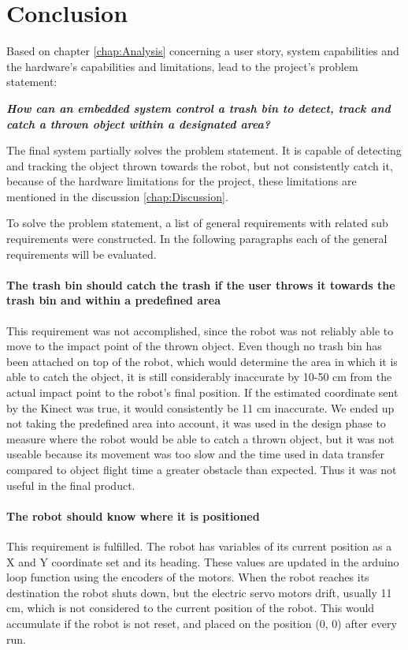 \chapter{Conclusion}
\label{chap:Conclusion}
Based on chapter \ref{chap:Analysis} concerning a user story, system capabilities and the hardware's capabilities and limitations, lead to the project’s problem statement: 

\textbf{\textit{How can an embedded system control a trash bin to detect, track and catch a thrown object within a designated area?}}

The final system partially solves the problem statement. It is capable of detecting and tracking the object thrown towards the robot, but not consistently catch it, because of the hardware limitations for the project, these limitations are mentioned in the discussion \ref{chap:Discussion}. 

To solve the problem statement, a list of general requirements with related sub requirements were constructed. In the following paragraphs each of the general requirements will be evaluated. 

\subsubsection{The trash bin should catch the trash if the user throws it towards the trash bin and within a predefined area}
\label{sub:1}
This requirement was not accomplished, since the robot was not reliably able to move to the impact point of the thrown object. Even though no trash bin has been attached on top of the robot, which would determine the area in which it is able to catch the object, it is still considerably inaccurate by 10-50 cm from the actual impact point to the robot’s final position. If the estimated coordinate sent by the Kinect was true, it would consistently be 11 cm inaccurate. \newline
We ended up not taking the predefined area into account, it was used in the design phase to measure where the robot would be able to catch a thrown object, but it was not useable because its movement was too slow and the time used in data transfer compared to object flight time a greater obstacle than expected. Thus it was not useful in the final product.


\subsubsection{The robot should know where it is positioned}
This requirement is fulfilled. The robot has variables of its current position as a X and Y coordinate set and its heading. These values are updated in the arduino loop function using the encoders of the motors. When the robot reaches its destination the robot shuts down, but the electric servo motors drift, usually 11 cm, which is not considered to the current position of the robot. This would accumulate if the robot is not reset, and placed on the position (0, 0) after every run.

